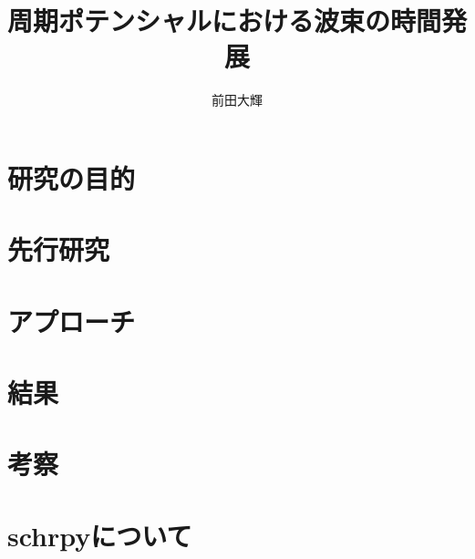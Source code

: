 \documentclass[autodetect-engine,dvipdfmx-if-dvi,ja=standard,a4paper]{bxjsreport}
\author{前田大輝}
\title{周期ポテンシャルにおける波束の時間発展}
\begin{document}
    \maketitle
    
    \chapter{研究の目的}
    \chapter{先行研究}
    \chapter{アプローチ}
    \chapter{結果}
    \chapter{考察}
    \chapter{schrpyについて}
\end{document}
